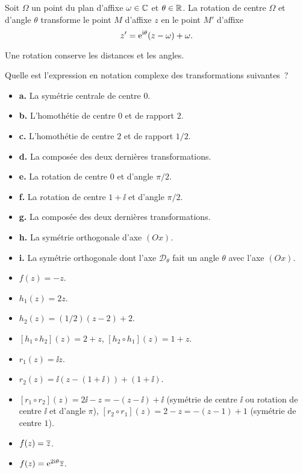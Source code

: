 \documentclass{magnoliaold}
\begin{document}
\begin{proposition}
Soit $\Omega$ un point du plan d'affixe $\omega\in\mathbb{C}$ et $\theta\in\mathbb{R}$. La rotation de centre $\Omega$ et d'angle $\theta$ transforme le point $M$ d'affixe $z$ en le point $M'$ d'affixe
\[z'={\rm e}^{{\rm i}\theta}(z-\omega)+\omega.\]
\end{proposition}

\begin{remarqueUnique}
\remarque Une rotation conserve les distances et les angles.
\end{remarqueUnique}

\begin{exoUnique}
\exo Quelle est l'expression en notation complexe des transformations suivantes~?
\begin{itemize}
\item \textbf{a.} La symétrie centrale de centre $0$.
\item \textbf{b.} L'homothétie de centre $0$ et de rapport $2$.
\item \textbf{c.} L'homothétie de centre $2$ et de rapport $1/2$.
\item \textbf{d.} La composée des deux dernières transformations.
\item \textbf{e.} La rotation de centre $0$ et d'angle $\pi/2$.
\item \textbf{f.} La rotation de centre $1+\ii$ et d'angle $\pi/2$.
\item \textbf{g.} La composée des deux dernières transformations.
\item \textbf{h.} La symétrie orthogonale d'axe $(Ox)$.
\item \textbf{i.} La symétrie orthogonale dont l'axe $\mathcal{D}_\theta$ fait un angle $\theta$ avec l'axe $(Ox)$.
\end{itemize}
\begin{sol}
\begin{itemize}
\item $f(z)=-z$.
\item $h_1(z)=2z$.
\item $h_2(z)=(1/2)(z-2)+2$.
\item $[h_1\circ h_2](z)=2+z$, $[h_2\circ h_1](z)=1+z$.
\item $r_1(z)=\ii z$.
\item $r_2(z)=\ii(z-(1+\ii))+(1+\ii)$.
\item $[r_1\circ r_2](z)=2\ii-z=-(z-\ii)+\ii$ (symétrie de centre $\ii$ ou rotation de centre $\ii$ et d'angle $\pi$), $[r_2\circ r_1](z)=2-z=-(z-1)+1$ (symétrie de centre $1$).
\item $f(z)=\overline{z}$.
\item $f(z)={\rm e}^{2{\rm i}\theta}\overline{z}$.
\end{itemize}
\end{sol}
\end{exoUnique}
\end{document}
